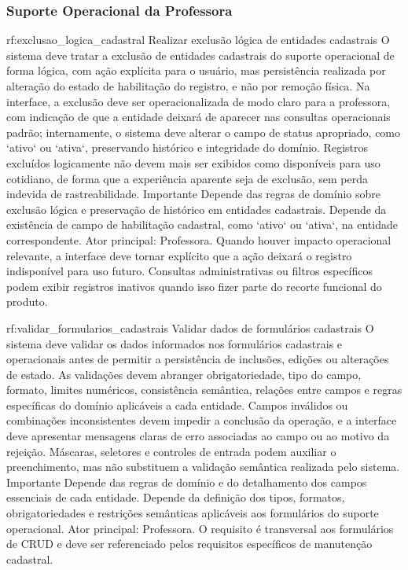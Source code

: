 \subsubsection*{Suporte Operacional da Professora}

\reqfuncfull
{rf:exclusao_logica_cadastral}
{Realizar exclusão lógica de entidades cadastrais}
{O sistema deve tratar a exclusão de entidades cadastrais do suporte operacional de forma lógica, com ação explícita para o usuário, mas persistência realizada por alteração do estado de habilitação do registro, e não por remoção física. Na interface, a exclusão deve ser operacionalizada de modo claro para a professora, com indicação de que a entidade deixará de aparecer nas consultas operacionais padrão; internamente, o sistema deve alterar o campo de status apropriado, como `ativo` ou `ativa`, preservando histórico e integridade do domínio. Registros excluídos logicamente não devem mais ser exibidos como disponíveis para uso cotidiano, de forma que a experiência aparente seja de exclusão, sem perda indevida de rastreabilidade.}
{Importante}
{Depende das regras de domínio sobre exclusão lógica e preservação de histórico em entidades cadastrais. Depende da existência de campo de habilitação cadastral, como `ativo` ou `ativa`, na entidade correspondente.}
{Ator principal: Professora. Quando houver impacto operacional relevante, a interface deve tornar explícito que a ação deixará o registro indisponível para uso futuro. Consultas administrativas ou filtros específicos podem exibir registros inativos quando isso fizer parte do recorte funcional do produto.}

\reqfuncfull
{rf:validar_formularios_cadastrais}
{Validar dados de formulários cadastrais}
{O sistema deve validar os dados informados nos formulários cadastrais e operacionais antes de permitir a persistência de inclusões, edições ou alterações de estado. As validações devem abranger obrigatoriedade, tipo do campo, formato, limites numéricos, consistência semântica, relações entre campos e regras específicas do domínio aplicáveis a cada entidade. Campos inválidos ou combinações inconsistentes devem impedir a conclusão da operação, e a interface deve apresentar mensagens claras de erro associadas ao campo ou ao motivo da rejeição. Máscaras, seletores e controles de entrada podem auxiliar o preenchimento, mas não substituem a validação semântica realizada pelo sistema.}
{Importante}
{Depende das regras de domínio e do detalhamento dos campos essenciais de cada entidade. Depende da definição dos tipos, formatos, obrigatoriedades e restrições semânticas aplicáveis aos formulários do suporte operacional.}
{Ator principal: Professora. O requisito é transversal aos formulários de CRUD e deve ser referenciado pelos requisitos específicos de manutenção cadastral.}

